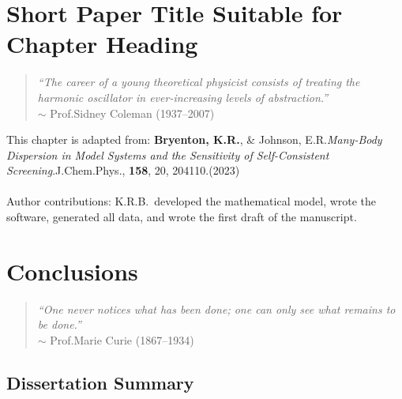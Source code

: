 \documentclass[12pt,letterpaper,oneside,titlepage,final]{dalthesis}
\numberwithin{equation}{section}
\begin{document}
\chapter[The title of your publication that has been inserted as a chapter in the main body of your thesis]{Short Paper Title Suitable for Chapter Heading} 
\label{Oscallot} \thispagestyle{Chapter}
\begin{quote}
\textsl{``The career of a young theoretical physicist consists of treating the harmonic oscillator in ever-increasing levels of abstraction.''} \cite{coleman2019lectures} \\ 
$\sim$ Prof.\@ Sidney Coleman (1937--2007) 
\end{quote}
\vspace*{1cm}
{
\noindent \color{darkgray} 
This chapter is adapted from: \textbf{Bryenton, K.\@ R.\@}, \& Johnson, E.\@ R.\@ \textit{Many-Body Dispersion in Model Systems and the Sensitivity of Self-Consistent Screening}.\@ J.\@ Chem.\@ Phys.\@, \textbf{158}, 20, 204110.\@ (2023) \cite{bryenton2023many}\\
\smallskip\\
Author contributions: K.R.B.\ developed the mathematical model, wrote the software, generated all data, and wrote the first draft of the manuscript.
}
\clearpage
 




\chapter[Conclusions]{Conclusions} \label{Conclusions} \thispagestyle{Chapter}
\begin{quote}
\textsl{``One never notices what has been done; one can only see what remains to be done.''} \cite{ratcliffe2014oxford} \\ 
$\sim$ Prof.\@ Marie Curie (1867--1934) 
\end{quote}
\vspace*{1cm}



\section{Dissertation Summary} \label{Ch4:Summary}
\end{document}
